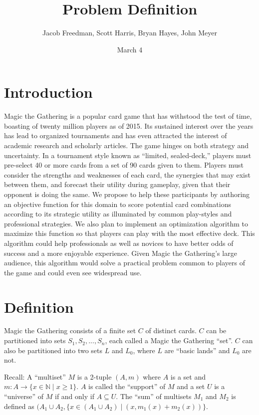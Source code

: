 \documentclass[12pt, letterpaper]{article}
\title{Problem Definition}
\date{March 4}
\author{Jacob Freedman, Scott Harris, Bryan Hayes, John Meyer}
\begin{document}
\maketitle

\section{Introduction}

Magic the Gathering is a popular card game that has withstood the test of time,
boasting of twenty million players as of 2015.
Its sustained interest over the years has lead to organized tournaments
and has even attracted the interest of academic research and scholarly articles.
The game hinges on both strategy and uncertainty.
In a tournament style known as \enquote{limited, sealed-deck,}
players must pre-select 40 or more cards from a set of 90 cards given to them.
Players must consider the strengths and weaknesses of each card,
the synergies that may exist between them,
and forecast their utility during gameplay,
given that their opponent is doing the same.
We propose to help these participants by authoring an objective function for this
domain to score potential card combinations according to its strategic utility
as illuminated by common play-styles and professional strategies.
We also plan to implement an optimization algorithm to maximize this function
so that players can play with the most effective deck.
This algorithm could help professionals as well as novices to have better odds of success
and a more enjoyable experience.
Given Magic the Gathering’s large audience,
this algorithm would solve a practical problem common to players of the game
and could even see widespread use.

\section{Definition}

Magic the Gathering consists of a finite set $ C $ of distinct cards.
$ C $ can be partitioned into sets $ S_1, S_2, ..., S_n $, each called a Magic the Gathering \enquote{set}.
$ C $ can also be partitioned into two sets $ L $ and $ L_0 $, where $ L $ are \enquote{basic lands} and $ L_0 $ are not.

Recall: A \enquote{multiset} $ M $ is a 2-tuple $ (A, m) $
where $ A $ is a set and $ m: A \rightarrow \{x \in \mathbb{N} \mid x \ge 1 \} $.
$ A $ is called the \enquote{support} of $ M $ and
a set $ U $ is a \enquote{universe} of $ M $ if and only if $ A \subseteq U $.
The \enquote{sum} of multisets $ M_1 $ and $ M_2 $ is defined as
$ (A_1 \cup A_2, \{ x \in (A_1 \cup A_2) \mid (x, m_1(x) + m_2(x)) \} $.
\end{document}
